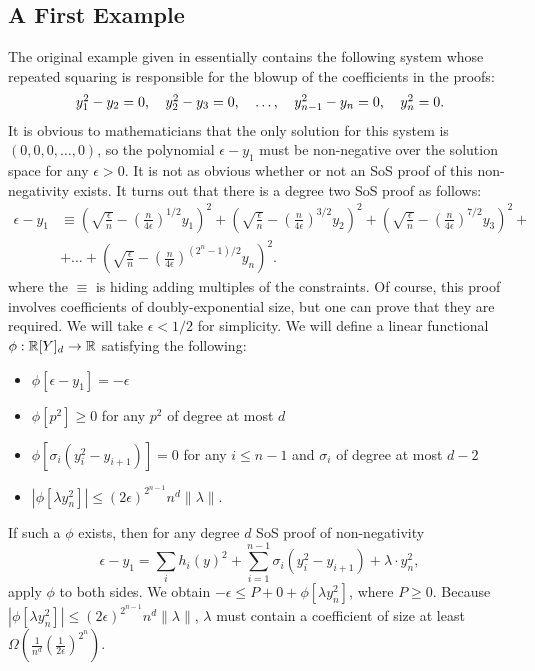 \subsection{A First Example}
The original example given in \cite{odonnell17} essentially contains the following system whose repeated squaring is responsible for the blowup of the coefficients in the proofs:
\[\begin{tabular}{ccccc}
$y_1^2 - y_2 = 0$, & $y_2^2 - y_3 = 0$, & $\dots$, & $y_{n-1}^2 - y_n = 0$, & $y_n^2 = 0$.
\end{tabular}\]
It is obvious to mathematicians that the only solution for this system is $(0,0,0,\dots,0)$, so the polynomial $\epsilon - y_1$ must be non-negative over the solution space for any $\epsilon > 0$. It is not as obvious whether or not an SoS proof of this non-negativity exists. It turns out that there is a degree two SoS proof as follows:
\begin{align}
\epsilon - y_1 &\equiv \left(\sqrt{\frac{\epsilon}{n}} - \left(\frac{n}{4\epsilon}\right)^{1/2}y_1\right)^2 + \left(\sqrt{\frac{\epsilon}{n}} - \left(\frac{n}{4\epsilon}\right)^{3/2}y_2\right)^2 + \left(\sqrt{\frac{\epsilon}{n}} - \left(\frac{n}{4\epsilon}\right)^{7/2}y_3\right)^2 + \nonumber\\
&+\dots + \left(\sqrt{\frac{\epsilon}{n}} - \left(\frac{n}{4\epsilon}\right)^{(2^n-1)/2}y_n\right)^2.\label{eq:proof}\tag{$*$}
\end{align}
where the $\equiv$ is hiding adding multiples of the constraints. Of course, this proof involves coefficients of doubly-exponential size, but one can prove that they are required. We will take $\epsilon < 1/2$ for simplicity. We will define a linear functional $\phi: \mathbb R[Y]_d \rightarrow \mathbb R$ satisfying the following:
\begin{itemize}
\item $\phi[\epsilon - y_1] = -\epsilon$
\item $\phi[p^2] \geq 0$ for any $p^2$ of degree at most $d$
\item $\phi[\sigma_i(y_i^2 - y_{i+1})] = 0$ for any $i \leq n-1$ and $\sigma_i$ of degree at most $d-2$
\item $|\phi[\lambda y_n^2]| \leq (2\epsilon)^{2^{n-1}}n^d\|\lambda\|$.
\end{itemize}
If such a $\phi$ exists, then for any degree $d$ SoS proof of non-negativity
\[\epsilon - y_1 = \sum_i h_i(y)^2 + \sum_{i=1}^{n-1} \sigma_i(y_i^2 - y_{i+1}) + \lambda \cdot y_n^2,\]
apply $\phi$ to both sides. We obtain $-\epsilon \leq P + 0 + \phi[\lambda y_n^2]$, where $P \geq 0$. Because $|\phi[\lambda y_n^2]| \leq (2\epsilon)^{2^{n-1}}n^d\|\lambda\|$, $\lambda$ must contain a coefficient of size at least $\Omega(\frac{1}{n^d}\left(\frac{1}{2\epsilon}\right)^{2^n})$.

